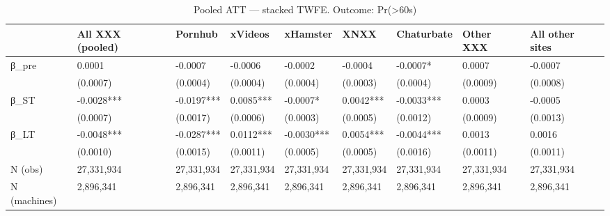 \begin{table}

\caption{Pooled ATT — stacked TWFE. Outcome: Pr(>60s)}
\centering
\begin{tabular}[t]{lllllllll}
\toprule
  & All XXX (pooled) & Pornhub & xVideos & xHamster & XNXX & Chaturbate & Other XXX & All other sites\\
\midrule
β\_pre & 0.0001 & -0.0007 & -0.0006 & -0.0002 & -0.0004 & -0.0007* & 0.0007 & -0.0007\\
 & (0.0007) & (0.0004) & (0.0004) & (0.0004) & (0.0003) & (0.0004) & (0.0009) & (0.0008)\\
β\_ST & -0.0028*** & -0.0197*** & 0.0085*** & -0.0007* & 0.0042*** & -0.0033*** & 0.0003 & -0.0005\\
 & (0.0007) & (0.0017) & (0.0006) & (0.0003) & (0.0005) & (0.0012) & (0.0009) & (0.0013)\\
β\_LT & -0.0048*** & -0.0287*** & 0.0112*** & -0.0030*** & 0.0054*** & -0.0044*** & 0.0013 & 0.0016\\
\addlinespace
 & (0.0010) & (0.0015) & (0.0011) & (0.0005) & (0.0005) & (0.0016) & (0.0011) & (0.0011)\\
N (obs) & 27,331,934 & 27,331,934 & 27,331,934 & 27,331,934 & 27,331,934 & 27,331,934 & 27,331,934 & 27,331,934\\
N (machines) & 2,896,341 & 2,896,341 & 2,896,341 & 2,896,341 & 2,896,341 & 2,896,341 & 2,896,341 & 2,896,341\\
\bottomrule
\end{tabular}
\end{table}
